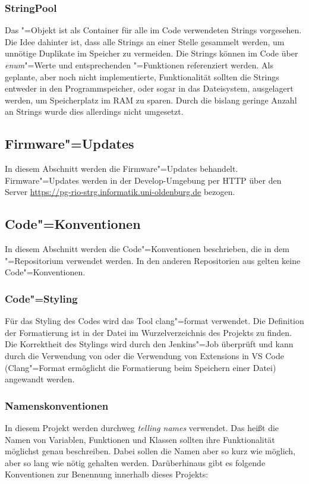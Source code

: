 \subsubsection{StringPool}
Das "=Objekt ist als Container für alle im Code verwendeten Strings vorgesehen.
Die Idee dahinter ist, dass alle Strings an einer Stelle gesammelt werden, um unnötige Duplikate im Speicher zu vermeiden.
Die Strings können im Code über \textit{enum}"=Werte und entsprechenden "=Funktionen referenziert werden.
Als geplante, aber noch nicht implementierte, Funktionalität sollten die Strings entweder in den Programmspeicher, oder sogar in das Dateisystem, ausgelagert werden, um Speicherplatz im RAM zu sparen.
Durch die bislang geringe Anzahl an Strings wurde dies allerdings nicht umgesetzt.

\subsection{Firmware"=Updates}
In diesem Abschnitt werden die Firmware"=Updates behandelt.
Firmware"=Updates werden in der Develop-Umgebung per HTTP über den Server \url{https://pg-rio-strg.informatik.uni-oldenburg.de} bezogen.


\subsection{Code"=Konventionen}
In diesem Abschnitt werden die Code"=Konventionen beschrieben, die in dem "=Repositorium verwendet werden.
In den anderen Repositorien aus  gelten keine Code"=Konventionen.

\subsubsection{Code"=Styling}
Für das Styling des Codes wird das Tool clang"=format verwendet.
Die Definition der Formatierung ist in der Datei  im Wurzelverzeichnis des Projekts zu finden.
Die Korrektheit des Stylings wird durch den Jenkins"=Job überprüft und kann durch die Verwendung von  oder die Verwendung von Extensions in VS Code (Clang"=Format ermöglicht die Formatierung beim Speichern einer Datei) angewandt werden.

\subsubsection{Namenskonventionen}
In diesem Projekt werden durchweg \textit{telling names} verwendet.
Das heißt die Namen von Variablen, Funktionen und Klassen sollten ihre Funktionalität möglichst genau beschreiben.
Dabei sollen die Namen aber so kurz wie möglich, aber so lang wie nötig gehalten werden.
Darüberhinaus gibt es folgende Konventionen zur Benennung innerhalb dieses Projekts:

